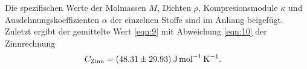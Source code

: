 Die spezifischen Werte der Molmassen $M$, Dichten $\rho$, Kompresionsmodule $\kappa$ und Ausdehnungskoeffizienten $\alpha$ der einzelnen Stoffe sind im Anhang beigefügt.
Zuletzt ergibt der gemittelte Wert \ref{eqn:9} mit Abweichung \ref{eqn:10} der Zinnrechnung
\begin{align}
  C_{\text{Zinn}}  &= (\num{48,31+-29,93})\: \si{\joule\per\mol\per\kelvin}.
\end{align}
